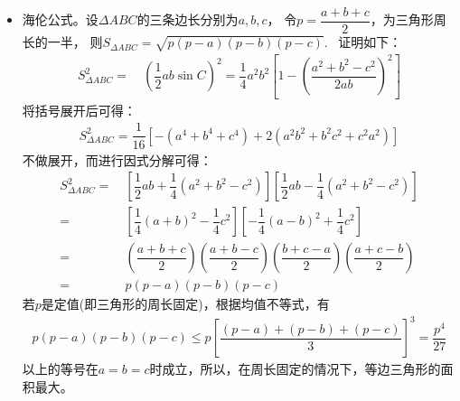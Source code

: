\begin{itemize}[leftmargin=\inteval{\myitemleftmargin}pt,itemsep=
   \inteval{\myitemitempsep}pt,topsep=\inteval{\myitemtopsep}pt]
若把(\ref{勾股定理正整数解通式})式中的$ a^2,b^2 $换成$ a,b $，有
\begin{align*}
    (a-b)^2+4ab=(a+b)^2
\end{align*}
再把上式的$ a,b $换成向量$ \vec{a},\vec{b} $，然后移项，有
\begin{align}\label{极化恒等式}
    4 \vec{a}\cdot \vec{b}=
    (\vec{a}+\vec{b})^2-(\vec{a}-\vec{b})^2
\end{align}
(\ref{极化恒等式})式被称为极化恒等式。

\item 海伦公式。设$ \Delta ABC $的三条边长分别为$ a,b,c $，
令$ p=\dfrac{a+b+c}{2} $，为三角形周长的一半，
则$ S_{\Delta ABC}=\sqrt{p(p-a)(p-b)(p-c)} $. \ 证明如下：
\begin{align*}
    S_{\Delta ABC}^2=&\ \left(\dfrac{1}{2}ab\sin C \right) ^2=
    \dfrac{1}{4}a^2b^2\left[ 1-\left( {\dfrac{a^2+b^2-c^2}{2ab}}\right)^2 \right] 
\end{align*}
将括号展开后可得：
\begin{align*}
    S_{\Delta ABC}^2=\dfrac{1}{16}\left[-(a^4+b^4+c^4)+2(a^2b^2+b^2c^2+c^2a^2)\right]
\end{align*}
不做展开，而进行因式分解可得：
\begin{align*}
    S_{\Delta ABC}^2
    =&\ \left[ \dfrac{1}{2}ab+\dfrac{1}{4}
    (a^2+b^2-c^2)\right] \left[ \dfrac{1}{2}ab-\dfrac{1}{4} (a^2+b^2-c^2) \right] \\
    =&\ \left[  \dfrac{1}{4}(a+b)^2-\dfrac{1}{4}c^2 \right] 
    \left[ -\dfrac{1}{4}(a-b)^2+\dfrac{1}{4}c^2 \right] \\
    =&\ \left(\dfrac{a+b+c}{2}\right) \left(\dfrac{a+b-c}{2}\right) 
    \left(\dfrac{b+c-a}{2}\right) \left(\dfrac{a+c-b}{2}\right) \\
    =&\ p(p-a)(p-b)(p-c)
\end{align*}
若$ p $是定值(即三角形的周长固定)，根据均值不等式，有
\begin{gather}\label{正三角形面积最大}
    p(p-a)(p-b)(p-c)\leq p\left[\dfrac{(p-a)+(p-b)+(p-c)}{3}\right]^3=\dfrac{p^4}{27}
\end{gather}
以上的等号在$ a=b=c $时成立，所以，在周长固定的情况下，等边三角形的面积最大。


\end{itemize}

